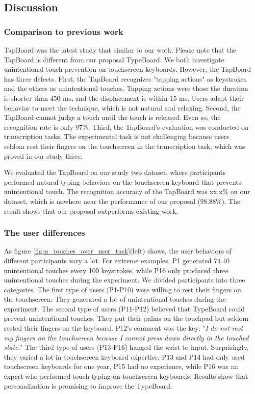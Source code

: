 \subsection{Discussion}

\subsubsection{Comparison to previous work}

TapBoard \cite{2013-TapBoard} was the latest study that similar to our work. 
Please note that the TapBoard is different from our proposal TypeBoard. We both investigate unintentional touch prevention on touchscreen keyboards. However, the TapBoard has three defects. First, the TapBoard recognizes "tapping actions" as keystrokes and the others as unintentional touches. Tapping actions were those the duration is shorter than 450 ms, and the displacement is within 15 ms. Users adapt their behavior to meet the technique, which is not natural and relaxing. Second, the TapBoard cannot judge a touch until the touch is released. Even so, the recognition rate is only 97\%. Third, the TapBoard's evaluation was conducted on transcription tasks. The experimental task is not challenging because users seldom rest their fingers on the touchscreen in the transcription task, which was proved in our study three.

We evaluated the TapBoard on our study two dataset, where participants performed natural typing behaviors on the touchscreen keyboard that prevents unintentional touch. The recognition accuracy of the TapBoard was xx.x\% on our dataset, which is nowhere near the performance of our proposal (98.88\%). The result shows that our proposal outperforms existing work.

\subsubsection{The user differences}

As figure \ref{fig:u_touches_over_user_task}(left) shows, the user behaviors of different participants vary a lot. For extreme examples, P1 generated 74.40 unintentional touches every 100 keystrokes, while P16 only produced three unintentional touches during the experiment. We divided participants into three categories. The first type of users (P1-P10) were willing to rest their fingers on the touchscreen. They generated a lot of unintentional touches during the experiment. The second type of users (P11-P12) believed that TypeBoard could prevent unintentional touches. They put their palms on the touchpad but seldom rested their fingers on the keyboard. P12's comment was the key: "\emph{I do not rest my fingers on the touchscreen because I cannot press down directly in the touched state.}" The third type of users (P13-P16) hanged the wrist to input. Surprisingly, they varied a lot in touchscreen keyboard expertise. P13 and P14 had only used touchscreen keyboards for one year, P15 had no experience, while P16 was an expert who performed touch typing on touchscreen keyboards. Results show that personalization is promising to improve the TypeBoard.

